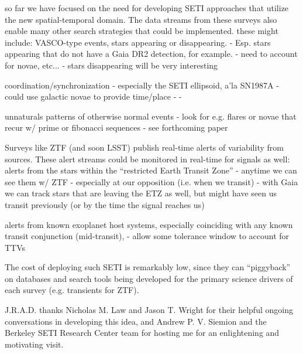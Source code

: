 \documentclass[twocolumn]{aastex62}
\begin{document}
so far we have focused on the need for developing SETI approaches that utilize the new spatial-temporal domain. The data streams from these surveys also enable many other search strategies that could be implemented. these might include:
VASCO-type events, stars appearing or disappearing. \citep{villarroel2016}
	- Esp. stars appearing that do not have a Gaia DR2 detection, for example.
	- need to account for novae, etc...
	- stars disappearing will be very interesting

coordination/synchronization \citep{makovetskii1977,shostak2004}
        - especially the SETI ellipsoid, a'la SN1987A \citep{lemarchand1994}
        - could use galactic novae to provide time/place
        - %
        - %

unnaturals patterns of otherwise normal events
	- look for e.g. flares or novae that recur w/ prime or fibonacci sequences
	- see forthcoming paper




Surveys like ZTF (and soon LSST) publish real-time alerts of variability from sources. These alert streams could be monitored in real-time for signals as well:
alerts from the stars within the ``restricted Earth Transit Zone'' \citep{heller2016}
	- anytime we can see them w/ ZTF
	- especially at our opposition (i.e. when we transit)
	- with Gaia we can track stars that are leaving the ETZ as well, but might 
	have seen us transit previously (or by the time the signal reaches us)

alerts from known exoplanet host systems, especially coinciding with any known transit conjunction (mid-transit), 
	- allow some tolerance window to account for TTVs



The cost of deploying such SETI is remarkably low, since they can ``piggyback'' on databases and search tools being developed for the primary science drivers of each survey (e.g. transients for ZTF).




\acknowledgments

J.R.A.D. thanks Nicholas M. Law and Jason T. Wright for their helpful ongoing conversations in developing this idea, and Andrew P. V. Siemion and the Berkeley SETI Research Center team for hosting me for an enlightening and motivating visit.
\end{document}
